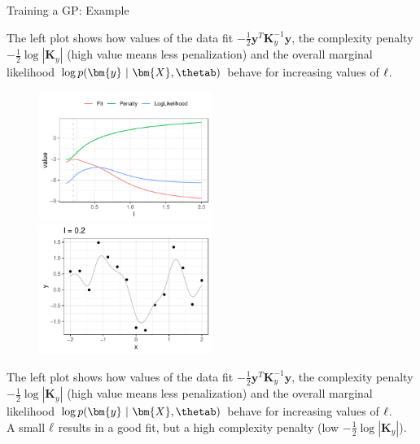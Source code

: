 \begin{vbframe}{Training a GP: Example}
\begin{footnotesize}
	The left plot shows how values of the data fit $-\frac{1}{2}\bm{y}^T\bm{K}_y^{-1} \bm{y}$, the complexity penalty $- \frac{1}{2} \log \left| \bm{K}_y \right|$ (high value means less penalization) and the overall marginal likelihood $\log p(\bm{y} ~|~ \bm{X}, \thetab)$ behave for increasing values of $\ell$.
\end{footnotesize}


\framebreak 

\begin{figure}
	\includegraphics[width = 0.5\textwidth]{figure_man/training/fit-vs-penalty-0_2.pdf}~	\includegraphics[width = 0.5\textwidth]{figure_man/training/datapoints-0_2.pdf}
\end{figure}

\begin{footnotesize}
		The left plot shows how values of the data fit $-\frac{1}{2}\bm{y}^T\bm{K}_y^{-1} \bm{y}$, the complexity penalty $- \frac{1}{2} \log \left| \bm{K}_y \right|$ (high value means less penalization) and the overall marginal likelihood $\log p(\bm{y} ~|~ \bm{X}, \thetab)$ behave for increasing values of $\ell$.\\ 
		A small $\ell$ results in a good fit, but a high complexity penalty (low $- \frac{1}{2} \log \left| \bm{K}_y \right|$).
\end{footnotesize}

\framebreak


\end{vbframe}
